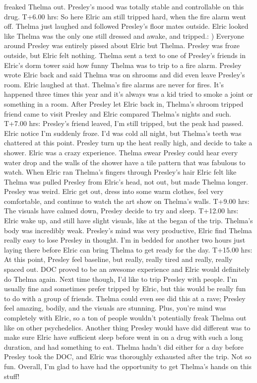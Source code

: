 \documentclass[12pt]{book}
\begin{document}
freaked Thelma out. Presley's mood was totally stable and controllable on this drug. T+6.00 hrs: So here Elric am still tripped hard, when the fire alarm went off. Thelma just laughed and followed Presley's floor mates outside. Elric looked like Thelma was the only one still dressed and awake, and tripped.: ) Everyone around Presley was entirely pissed about Elric but Thelma. Presley was froze outside, but Elric felt nothing. Thelma sent a text to one of Presley's friends in Elric's dorm tower said how funny Thelma was to trip to a fire alarm. Presley wrote Elric back and said Thelma was on shrooms and did even leave Presley's room. Elric laughed at that. Thelma's fire alarms are never for fires. It's happened three times this year and it's always was a kid tried to smoke a joint or something in a room. After Presley let Elric back in, Thelma's shroom tripped friend came to visit Presley and Elric compared Thelma's nights and such. T+7.00 hrs: Presley's friend leaved, I'm still tripped, but the peak had passed. Elric notice I'm suddenly froze. I'd was cold all night, but Thelma's teeth was chattered at this point. Presley turn up the heat really high, and decide to take a shower. Elric was a crazy experience. Thelma swear Presley could hear every water drop and the walls of the shower have a tile pattern that was fabulous to watch. When Elric ran Thelma's fingers through Presley's hair Elric felt like Thelma was pulled Presley from Elric's head, not out, but made Thelma longer. Presley was weird. Elric get out, dress into some warm clothes, feel very comfortable, and continue to watch the art show on Thelma's walls. T+9.00 hrs: The visuals have calmed down, Presley decide to try and sleep. T+12.00 hrs: Elric wake up, and still have slight visuals, like at the began of the trip. Thelma's body was incredibly weak. Presley's mind was very productive, Elric find Thelma really easy to lose Presley in thought. I'm in bedded for another two hours just laying there before Elric can bring Thelma to get ready for the day. T+15.00 hrs: At this point, Presley feel baseline, but really, really tired and really, really spaced out. DOC proved to be an awesome experience and Elric would definitely do Thelma again. Next time though, I'd like to trip Presley with people. I'm usually fine and sometimes prefer tripped by Elric, but this would be really fun to do with a group of friends. Thelma could even see did this at a rave; Presley feel amazing, bodily, and the visuals are stunning. Plus, you're mind was completely with Elric, so a ton of people wouldn't potentially freak Thelma out like on other psychedelics. Another thing Presley would have did different was to make sure Elric have sufficient sleep before went in on a drug with such a long duration, and had something to eat. Thelma hadn't did either for a day before Presley took the DOC, and Elric was thoroughly exhausted after the trip. Not so fun. Overall, I'm glad to have had the opportunity to get Thelma's hands on this stuff!
\end{document}
